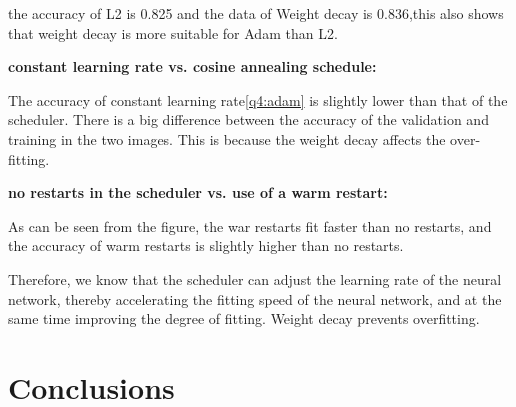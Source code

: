 \documentclass{article}
\begin{document}
\begin{figure}[H]\label{q4:adam}
	\centering  %
	\label{Fig.main}
	\label{Fig.main}
\end{figure}



the accuracy of L2 is 0.825 and the data of Weight decay is 0.836,this also shows that weight decay is more suitable for Adam than L2.

\textbf{constant learning rate vs. cosine annealing schedule:}

The accuracy of constant learning rate\ref{q4:adam}  is slightly lower than that of the scheduler. There is a big difference between the accuracy of the validation and training in the two images. This is because the weight decay affects the over-fitting.

\textbf{no restarts in the scheduler vs. use of a warm restart:}

As can be seen from the figure, the war restarts fit faster than no restarts, and the accuracy of warm restarts is slightly higher than no restarts.


Therefore, we know that the scheduler can adjust the learning rate of the neural network, thereby accelerating the fitting speed of the neural network, and at the same time improving the degree of fitting.
Weight decay prevents overfitting.


\section{Conclusions}
\label{sec:concl}
\end{document}
